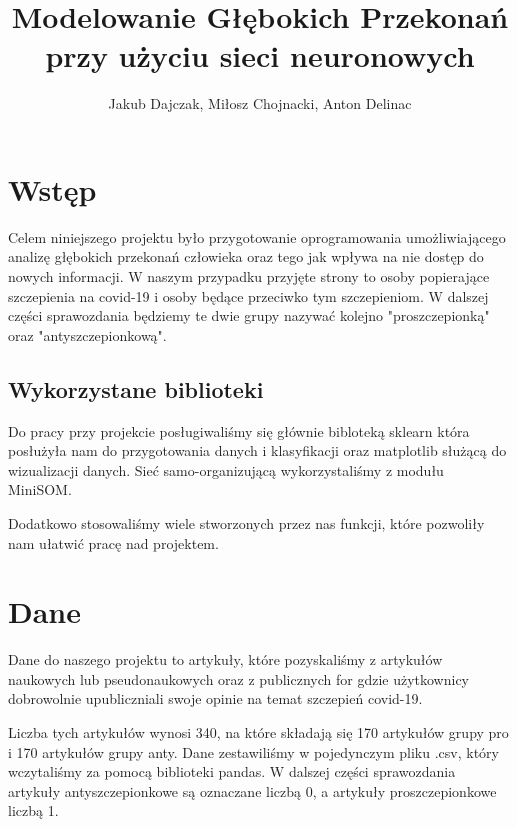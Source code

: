 \documentclass[11pt]{article}
\title{Modelowanie Głębokich Przekonań
    przy użyciu sieci neuronowych}
\author{Jakub Dajczak, Miłosz Chojnacki, Anton Delinac}
\begin{document}
    
    \maketitle
    

\section*{Wstęp}

Celem niniejszego projektu było przygotowanie oprogramowania umożliwiającego 
analizę głębokich przekonań człowieka oraz tego jak wpływa na nie dostęp do 
nowych informacji. W naszym przypadku przyjęte strony to osoby popierające 
szczepienia na covid-19 i osoby będące przeciwko tym szczepieniom. W dalszej 
części sprawozdania będziemy te dwie grupy nazywać kolejno "proszczepionką" 
oraz "antyszczepionkową".

\subsection*{Wykorzystane biblioteki}

Do pracy przy projekcie posługiwaliśmy się głównie bibloteką sklearn która posłużyła nam do
przygotowania danych i klasyfikacji oraz matplotlib służącą do wizualizacji danych.
Sieć samo-organizującą wykorzystaliśmy z modułu MiniSOM.

Dodatkowo stosowaliśmy wiele stworzonych przez nas funkcji, które pozwoliły nam 
ułatwić pracę nad projektem.

\section*{Dane}

Dane do naszego projektu to artykuły, które pozyskaliśmy z artykułów naukowych 
lub pseudonaukowych oraz
z publicznych for gdzie użytkownicy dobrowolnie upubliczniali swoje opinie 
na temat szczepień covid-19.

Liczba tych artykułów wynosi 340, na które składają się 170 
artykułów grupy pro i 170 artykułów grupy anty. Dane zestawiliśmy w pojedynczym 
pliku .csv, który wczytaliśmy za pomocą biblioteki pandas. W dalszej części 
sprawozdania artykuły antyszczepionkowe są oznaczane liczbą 0, a artykuły 
proszczepionkowe liczbą 1.

        
\begin{center}
\end{center}
    
\end{document}
